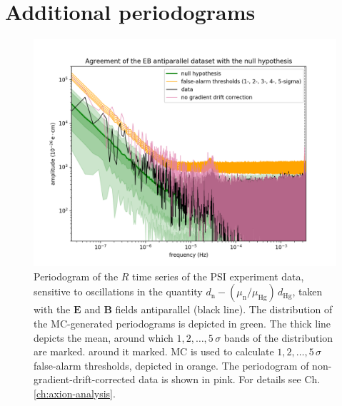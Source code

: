 \chapter{Additional periodograms}
\label{ch:alp_appendix}

\begin{figure}[h!]
  \centering
  \includegraphics[width=\linewidth]{gfx/axions/AP_detection_and_no_GDC.png}
  \caption{Periodogram of the $R$ time series of the PSI experiment data, sensitive to oscillations in the quantity $d_\mathrm{n} - \left( \mu_\mathrm{n} / \mu_\mathrm{Hg} \right) \, d_\mathrm{Hg}$, taken with the $\mathbf{E}$ and $\mathbf{B}$ fields antiparallel (black line).
  The distribution of the MC-generated periodograms is depicted in green. The thick line depicts the mean, around which $1,2,…,5\,\sigma$ bands of the distribution are marked. around it marked. MC is used to calculate $1,2,…,5\,\sigma$ false-alarm thresholds, depicted in orange.
  The periodogram of non-gradient-drift-corrected data is shown in pink. For details see Ch.\,\ref{ch:axion-analysis}.}\label{fig:app_AP_periodogram}
\end{figure}

